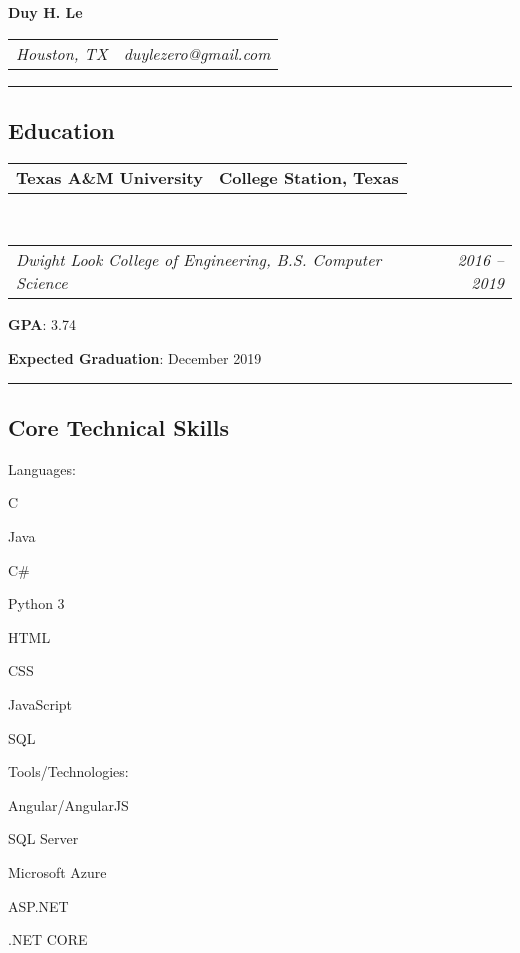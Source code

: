 \documentclass[10pt,letterpaper]{article}
\makeatletter
\newenvironment{indentsection}[1]%
{\begin{list}{}%
	{\setlength{\leftmargin}{#1}}%
	\item[]%
}
{\end{list}}
\newcommand{\headerrow}[2]
{\begin{tabular*}{\linewidth}{l@{\extracolsep{\fill}}r}
	#1 &
	#2 \\
\end{tabular*}}
\newcommand{\CPP}
{C\nolinebreak[4]\hspace{-.05em}\raisebox{.22ex}{\footnotesize\bf ++}}
\makeatother
\begin{document}
\begin{center}
{\LARGE \textbf{Duy H. Le}}
\end{center}
	\headerrow
		{\emph{Houston, TX}}
		{\emph{duylezero@gmail.com}}
\hrule
\vspace{-0.8em}
\subsection*{Education}

	\headerrow
		{\textbf{Texas A\&M University}}
		{\textbf{College Station, Texas}}
	\\
	\headerrow
		{\emph{Dwight Look College of Engineering, B.S. Computer Science}}
		{\emph{2016 -- 2019}}
	\begin{itemize*}
		\item \textbf{GPA}: 3.74
		\item \textbf{Expected Graduation}: December 2019
	\end{itemize*}

\hrule
\vspace{-0.8em}
\subsection*{Core Technical Skills}
\vspace{-0.4em}
\begin{indentsection}{\parindent}
\begin{description*}
	\item[Languages:]
	\begin{inparaitem}
 		 \CPP
		\item Java
		\item C\#
		\item Python 3
		\item HTML
		\item CSS
		\item JavaScript
		\item SQL
	\end{inparaitem}
	\item[Tools/Technologies:]
		\begin{inparaitem}
 		 Angular/AngularJS
		\item SQL Server
		\item Microsoft Azure
		\item ASP.NET
		\item .NET CORE
	\end{inparaitem}
\end{description*}
\end{indentsection}
\end{document}

